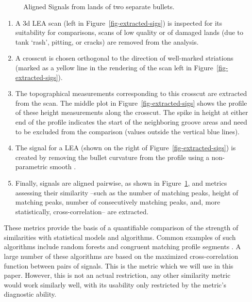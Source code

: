 \documentclass[
  number,
  preprint,
  5p,
  twocolumn]{elsarticle}
\begin{document}
\begin{figure}


\caption{\label{fig-aligned-sigs}Aligned Signals from lands of two
separate bullets.}

\end{figure}%

\begin{enumerate}
\def\labelenumi{\arabic{enumi}.}
\item
  A 3d LEA scan (left in Figure~\ref{fig-extracted-sigs}) is inspected
  for its suitability for comparisons, scans of low quality or of
  damaged lands (due to tank `rash', pitting, or cracks) are removed
  from the analysis.
\item
  A crosscut is chosen orthogonal to the direction of well-marked
  striations (marked as a yellow line in the rendering of the scan left
  in Figure~\ref{fig-extracted-sigs}).
\item
  The topographical measurements corresponding to this crosscut are
  extracted from the scan. The middle plot in
  Figure~\ref{fig-extracted-sigs} shows the profile of these height
  measurements along the crosscut. The spike in height at either end of
  the profile indicates the start of the neighboring groove areas and
  need to be excluded from the comparison (values outside the vertical
  blue lines).
\item
  The signal for a LEA (shown on the right of
  Figure~\ref{fig-extracted-sigs}) is created by removing the bullet
  curvature from the profile using a non-parametric smooth
  \citep{clevelandRobustLocallyWeighted1979}.
\item
  Finally, signals are aligned pairwise, as shown in
  Figure~\ref{fig-aligned-sigs}, and metrics assessing their similarity
  --such as the number of matching peaks, height of matching peaks,
  number of consecutively matching peaks, and, more statistically,
  cross-correlation-- are extracted.
\end{enumerate}

These metrics provide the basis of a quantifiable comparison of the
strength of similarities with statistical models and algorithms. Common
examples of such algorithms include random forests
\citep{hofmannBulletxtrctrAutomaticMatching2022} and congruent matching
profile segments
\citep{chenFiredBulletSignature2019, juOpenSourceImplementationCMPS2022}.
A large number of these algorithms are based on the maximized
cross-correlation function between pairs of signals. This is the metric
which we will use in this paper. However, this is not an actual
restriction, any other similarity metric would work similarly well, with
its usability only restricted by the metric's diagnostic ability.
\end{document}
